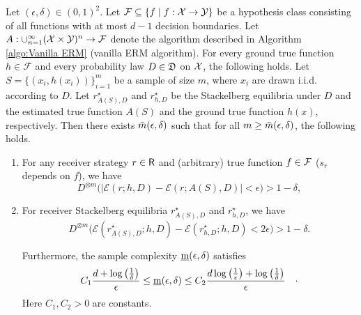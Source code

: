 \begin{lem}\label{lem:same distribution}
Let $(\epsilon, \delta) \in (0,1)^2$.
Let $\mathcal{F} \subseteq \{ f \mid f: \mathcal{X} \rightarrow \mathcal{Y} \}$ be a hypothesis class consisting of all functions with at most $d-1$ decision boundaries. Let $A: \cup_{n=1}^\infty (\mathcal{X} \times \mathcal{Y})^n \rightarrow \mathcal{F}$ denote the algorithm described in Algorithm \ref{algo:Vanilla ERM} (vanilla ERM algorithm).
For every ground true function $h \in \mathcal{F}$ and every probability law $D \in \mathfrak{D}$ on $\mathcal{X}$, the following holds. Let $S = \{(x_i, h(x_i))\}_{i=1}^m$ be a sample of size $m$, where $x_i$ are drawn i.i.d. according to $D$. Let $r^\star_{A(S),D}$ and $r^\star_{h,D}$ be the Stackelberg equilibria under $D$ and the estimated true function $A(S)$ and the ground true function $h(x)$, respectively. Then there exists $\bar{m}(\epsilon,\delta)$ such that for all $m \geq \bar{m}(\epsilon,\delta)$, the following holds.

\begin{enumerate}[label=(\alph*)]
    \item \label{lem:same distribution (a)} For any receiver strategy $r \in \mathsf{R}$ and (arbitrary) true function $f \in \mathcal{F}$ ($s_r$ depends on $f$), we have \begin{equation*}
        D^{\otimes m}\big(|\mathcal{E}(r; h,D) - \mathcal{E}(r; A(S), D)| < \epsilon\big) > 1 - \delta,
    \end{equation*}

    \item \label{lem:same distribution (b)} For receiver Stackelberg equilibria $r^\star_{A(S),D}$ and $r^\star_{h,D}$, we have \begin{equation}\label{eqn:lem:vanilla ERM PAC bound}
    D^{\otimes m}\big(\mathcal{E}(r^\star_{A(S),D}; h,D) - \mathcal{E}(r^\star_{h,D}; h, D) < 2\epsilon\big) > 1 - \delta.
\end{equation}

Furthermore, the sample complexity $\underbar{m}(\epsilon,\delta)$ satisfies
\begin{equation}\label{eqn:sample complexity:lem:same distribution}
    \begin{aligned}
        C_1 \frac{d + \log\left(\frac{1}{\delta}\right)}{\epsilon} &\leq \underbar{m}(\epsilon,\delta) \leq C_2 \frac{d \log\left(\frac{1}{\epsilon}\right) + \log\left(\frac{1}{\delta}\right)}{\epsilon}
    \end{aligned}.
\end{equation}
Here $C_1, C_2 > 0$ are constants.
\end{enumerate}

\end{lem}


